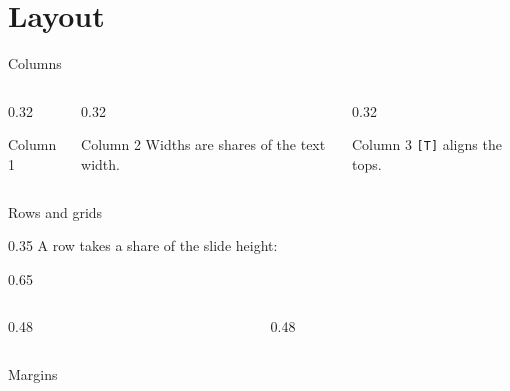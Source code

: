 \section{Layout}

\begin{frame}{Columns}
  \begin{columns}[T]
    \begin{column}{0.32\textwidth}
      \begin{block}{Column 1}
      \end{block}
    \end{column}
    \begin{column}{0.32\textwidth}
      \begin{block}{Column 2}
        Widths are shares of the text width.
      \end{block}
    \end{column}
    \begin{column}{0.32\textwidth}
      \begin{block}{Column 3}
        \texttt{[T]} aligns the tops.
      \end{block}
    \end{column}
  \end{columns}
\end{frame}

\begin{frame}{Rows and grids}
  \begin{rows}
    \begin{row}{0.35}
      \centering A row takes a share of the slide height: 
    \end{row}
    \begin{row}[t]{0.65}
      \begin{columns}[T]
        \begin{column}{0.48\textwidth}
        \end{column}
        \begin{column}{0.48\textwidth}
        \end{column}
      \end{columns}
    \end{row}
  \end{rows}
\end{frame}

\SetTextMargins{0.3cm}{0.3cm}
\begin{frame}{Margins}
\end{frame}
\SetTextMargins{1cm}{1cm}
